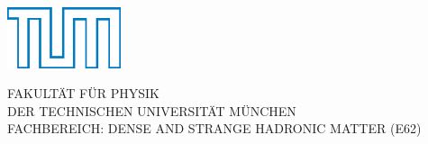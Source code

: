\thispagestyle{empty}

\begin{center}
  \includegraphics[width=0.25\textwidth]{style/TUMLogo_oZ_Outline_blau_CMYK}
  
  \vspace{1em}
  \Large FAKULTÄT FÜR PHYSIK\\
  \vspace{1em}
  \large DER TECHNISCHEN UNIVERSITÄT MÜNCHEN\\
   \vspace{0.5em}
  \large FACHBEREICH: DENSE AND STRANGE HADRONIC MATTER (E62)\\
  \vspace{0.5em}
  
\end{center}

